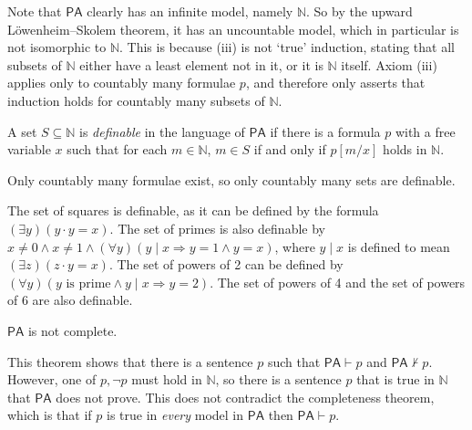 Note that \( \mathsf{PA} \) clearly has an infinite model, namely \( \mathbb N \).
So by the upward L\"owenheim--Skolem theorem, it has an uncountable model, which in particular is not isomorphic to \( \mathbb N \).
This is because (iii) is not `true' induction, stating that all subsets of \( \mathbb N \) either have a least element not in it, or it is \( \mathbb N \) itself.
Axiom (iii) applies only to countably many formulae \( p \), and therefore only asserts that induction holds for countably many subsets of \( \mathbb N \).
\begin{definition}
    A set \( S \subseteq \mathbb N \) is \emph{definable} in the language of \( \mathsf{PA} \) if there is a formula \( p \) with a free variable \( x \) such that for each \( m \in \mathbb N \), \( m \in S \) if and only if \( p[m/x] \) holds in \( \mathbb N \).
\end{definition}
Only countably many formulae exist, so only countably many sets are definable.
\begin{example}
    The set of squares is definable, as it can be defined by the formula \( (\exists y)(y\cdot y = x) \).
    The set of primes is also definable by \( x \neq 0 \wedge x \neq 1 \wedge (\forall y)(y \mid x \Rightarrow y = 1 \wedge y = x) \), where \( y \mid x \) is defined to mean \( (\exists z)(z \cdot y = x) \).
    The set of powers of 2 can be defined by \( (\forall y)(y \text{ is prime} \wedge y \mid x \Rightarrow y = 2) \).
    The set of powers of 4 and the set of powers of 6 are also definable.
\end{example}
\begin{theorem}
    \( \mathsf{PA} \) is not complete.
\end{theorem}
This theorem shows that there is a sentence \( p \) such that \( \mathsf{PA} \vdash p \) and \( \mathsf{PA} \not\vdash p \).
However, one of \( p, \neg p \) must hold in \( \mathbb N \), so there is a sentence \( p \) that is true in \( \mathbb N \) that \( \mathsf{PA} \) does not prove.
This does not contradict the completeness theorem, which is that if \( p \) is true in \emph{every} model in \( \mathsf{PA} \) then \( \mathsf{PA} \vdash p \).
